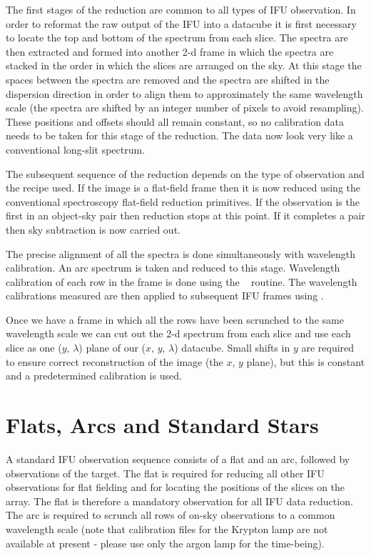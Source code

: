 \documentclass[twoside,11pt,nolof]{starlink}
\providecommand{\FIGARO}{\xref{{\sc{Figaro}}}{sun86}{}}
\begin{document}
The first stages of the reduction are common to all types of IFU
observation. In order to reformat the raw output of the IFU into a
datacube it is first necessary to locate the top and bottom of the
spectrum from each slice. The spectra are then extracted and formed
into another 2-d frame in which the spectra are stacked in the order
in which the slices are arranged on the sky. At this stage the spaces
between the spectra are removed and the spectra are shifted in the
dispersion direction in order to align them to approximately the same
wavelength scale (the spectra are shifted by an integer number of
pixels to avoid resampling). These positions and offsets should all
remain constant, so no calibration data needs to be taken for this
stage of the reduction. The data now look very like a conventional
long-slit spectrum.

The subsequent sequence of the reduction depends on the type of
observation and the recipe used.  If the image is a flat-field frame
then it is now reduced using the conventional spectroscopy flat-field
reduction primitives. If the observation is the first in an object-sky
pair then reduction stops at this point. If it completes a pair then
sky subtraction is now carried out.

The precise alignment of all the spectra is done simultaneously with
wavelength calibration. An arc spectrum is taken and reduced to this
stage. Wavelength calibration of each row in the frame is done using
the \FIGARO\  routine. The
wavelength calibrations measured are then applied to subsequent IFU
frames using .

Once we have a frame in which all the rows have been scrunched to the
same wavelength scale we can cut out the 2-d spectrum from each slice
and use each slice as one ($y$, $\lambda$) plane of our ($x$,
$y$, $\lambda$) datacube. Small shifts in $y$ are required to ensure correct
reconstruction of the image (the $x$, $y$ plane), but this is constant
and a predetermined calibration is used.


\section{Flats, Arcs and Standard Stars}

A standard IFU observation sequence consists of a flat and an arc,
followed by observations of the target. The flat is required for
reducing all other IFU observations for flat fielding and for locating
the positions of the slices on the array. The flat is therefore a
mandatory observation for all IFU data reduction. The arc is required
to scrunch all rows of on-sky observations to a common wavelength
scale (note that calibration files for the Krypton lamp are not
available at present - please use only the argon lamp for the
time-being).
\end{document}

